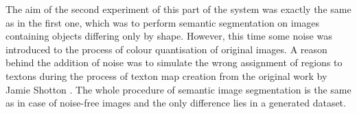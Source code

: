 The aim of the second experiment of this part of the system was exactly the same as in the first one, which was to perform semantic segmentation on images containing objects differing only by shape. However, this time some noise was introduced to the process of colour quantisation of original images. A reason behind the addition of noise was to simulate the wrong assignment of regions to textons during the process of texton map creation from the original work by Jamie Shotton \cite{article_main}. The whole procedure of semantic image segmentation is the same as in case of noise-free images and the only difference lies in a generated dataset. 